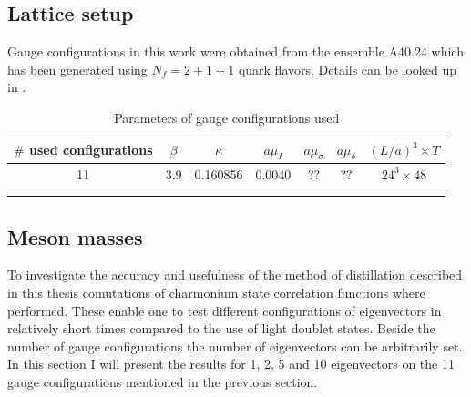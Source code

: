 

\subsection{Lattice setup}
    Gauge configurations in this work were obtained from the ensemble A40.24 which has been generated using $N_f = 2 + 1 + 1$ quark flavors. Details can be looked up in \cite{guage_configurations}.
    
    \begin{table}[h]
        \centering
        \begin{tabular}{lllllll}
        \hline
        \multicolumn{1}{|c|}{$\#$ used configurations} & \multicolumn{1}{c|}{$\beta$} & \multicolumn{1}{c|}{$\kappa$} & \multicolumn{1}{c|}{$a\mu_I$} & \multicolumn{1}{c|}{$a\mu_\sigma$} & \multicolumn{1}{c|}{$a\mu_\delta$} & \multicolumn{1}{c|}{$(L/a)^3 \times T$} \\ \hline
        \multicolumn{1}{|c|}{11} & \multicolumn{1}{c|}{3.9} & \multicolumn{1}{c|}{0.160856} & \multicolumn{1}{c|}{0.0040} & \multicolumn{1}{c|}{??} & \multicolumn{1}{c|}{??} & \multicolumn{1}{c|}{$24^3 \times 48$} \\ \hline
                               &                       &                       &                       &                       &                       &                       \\
                               &                       &                       &                       &                       &                       &                      
        \end{tabular}
        \caption{Parameters of gauge configurations used}
        \label{table_gauge_params}
    \end{table}
    
\subsection{Meson masses}
    To investigate the accuracy and usefulness of the method of distillation described in this thesis comutations of charmonium state correlation functions where performed. These enable one to test different configurations of eigenvectors in relatively short times compared to the use of light doublet states. Beside the number of gauge configurations the number of eigenvectors can be arbitrarily set. In this section I will present the results for 1, 2, 5 and 10 eigenvectors on the 11 gauge configurations mentioned in the previous section.\\
    
